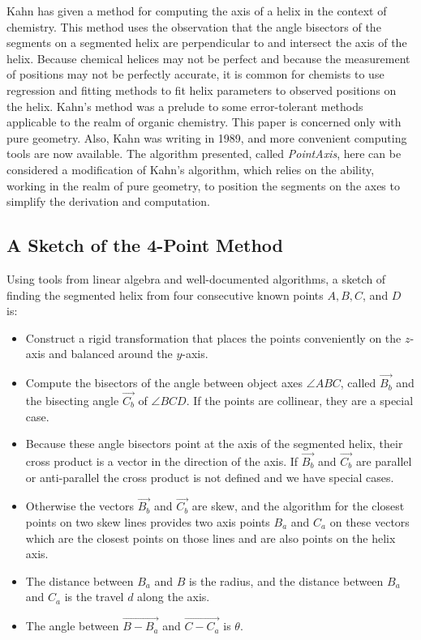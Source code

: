 \documentclass{svproc}
\begin{document}
Kahn\cite{kahn1989defining} has given a method for computing
the axis of a helix in the context of chemistry.
This method uses the observation that the angle bisectors
of the segments on a segmented helix are perpendicular to
and intersect the axis of the helix.
Because chemical helices may not be perfect and because the measurement of positions may not be perfectly accurate,
it is common for chemists to use regression and fitting methods to fit helix parameters to observed positions
on the helix.
Kahn's method was a prelude to some error-tolerant methods applicable to
the realm of organic chemistry\cite{enkhbayar2008helfit}.
This paper is concerned only with pure geometry. Also, Kahn was writing in 1989,
and more convenient computing tools are now available.
The algorithm presented, called {\em PointAxis}, here can be considered a modification of Kahn's algorithm,
which relies on the ability, working in the realm of pure geometry, to position the segments on the axes
to simplify the derivation and computation.

\subsection{A Sketch of the 4-Point Method}

Using tools from linear algebra and well-documented algorithms, a sketch of finding the segmented helix from
four consecutive known points $A,B,C$, and $D$ is:
\begin{itemize}
\item Construct a rigid transformation that places the points conveniently on the $z$-axis and balanced
  around the $y$-axis.
\item Compute the bisectors of the angle between object axes $ \angle{ABC}$, called $\overrightarrow{B_b}$ and the
  bisecting angle $\overrightarrow{C_b}$ of $\angle{BCD}$.
  If the points are collinear, they are a special case.
\item Because these angle bisectors point at the axis of the segmented helix, their cross product is a vector
  in the direction of the axis. If $\overrightarrow{B_b}$ and $\overrightarrow{C_b}$ are parallel or anti-parallel the cross product is not defined
  and we have special cases.
\item  Otherwise the vectors $\overrightarrow{B_b}$ and $\overrightarrow{C_b}$ are skew, and the algorithm for the closest points on
  two skew lines provides two axis points $B_a$ and $C_a$ on these vectors which
  are the closest points on those lines and are also points on the helix axis.
\item The distance between $B_a$ and $B$ is the radius, and the distance between $B_a$ and $C_a$ is the travel $d$ along the axis.
  \item The angle between $\overrightarrow{B - B_a}$ and $\overrightarrow{C - C_a}$ is $\theta$.
\end{itemize}
\end{document}

